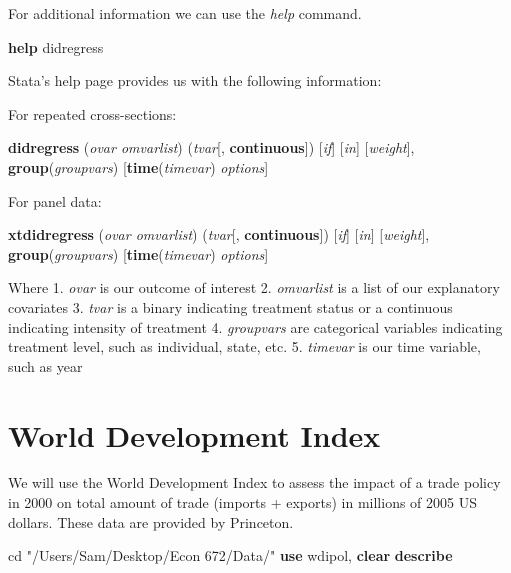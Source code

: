 \documentclass[
]{book}
\newenvironment{Shaded}{\begin{snugshade}}{\end{snugshade}}
\newcommand{\KeywordTok}[1]{\textcolor[rgb]{0.13,0.29,0.53}{\textbf{#1}}}
\newcommand{\NormalTok}[1]{#1}
\newcommand{\StringTok}[1]{\textcolor[rgb]{0.31,0.60,0.02}{#1}}
\begin{document}
For additional information we can use the \emph{help} command.

\begin{Shaded}
\begin{Highlighting}[]
\KeywordTok{help}\NormalTok{ didregress}
\end{Highlighting}
\end{Shaded}

Stata's help page provides us with the following information:

For repeated cross-sections:

\textbf{didregress} (\emph{ovar omvarlist}) (\emph{tvar}{[}, \textbf{continuous}{]}) {[}\emph{if}{]} {[}\emph{in}{]} {[}\emph{weight}{]}, \textbf{group}(\emph{groupvars}) {[}\textbf{time}(\emph{timevar}) \emph{options}{]}

For panel data:

\textbf{xtdidregress} (\emph{ovar omvarlist}) (\emph{tvar}{[}, \textbf{continuous}{]}) {[}\emph{if}{]} {[}\emph{in}{]} {[}\emph{weight}{]}, \textbf{group}(\emph{groupvars}) {[}\textbf{time}(\emph{timevar}) \emph{options}{]}

Where
1. \emph{ovar} is our outcome of interest
2. \emph{omvarlist} is a list of our explanatory covariates
3. \emph{tvar} is a binary indicating treatment status or a continuous indicating intensity of treatment
4. \emph{groupvars} are categorical variables indicating treatment level, such as individual, state, etc.
5. \emph{timevar} is our time variable, such as year

\section{World Development Index}\label{world-development-index}

We will use the World Development Index to assess the impact of a trade policy in 2000 on total amount of trade (imports + exports) in millions of 2005 US dollars. These data are provided by Princeton.

\begin{Shaded}
\begin{Highlighting}[]
\NormalTok{cd }\StringTok{"/Users/Sam/Desktop/Econ 672/Data/"}
\KeywordTok{use}\NormalTok{ wdipol, }\KeywordTok{clear}
\KeywordTok{describe}
\end{Highlighting}
\end{Shaded}
\end{document}
